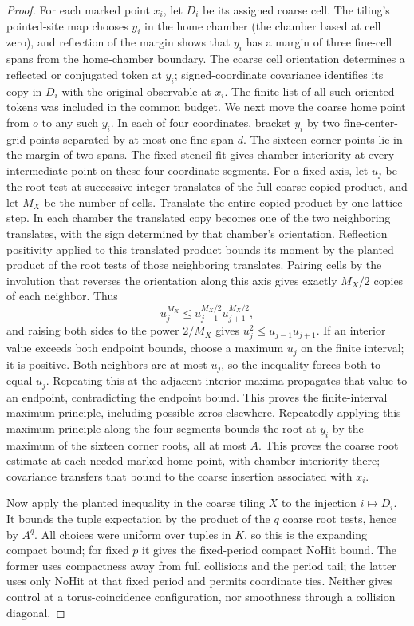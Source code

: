 \begin{proof}
For each marked point $x_i$, let $D_i$ be its assigned coarse cell. The tiling's pointed-site map chooses $y_i$ in the home chamber (the chamber based at cell zero), and reflection of the margin shows that $y_i$ has a margin of three fine-cell spans from the home-chamber boundary. The coarse cell orientation determines a reflected or conjugated token at $y_i$; signed-coordinate covariance identifies its copy in $D_i$ with the original observable at $x_i$. The finite list of all such oriented tokens was included in the common budget. We next move the coarse home point from $o$ to any such $y_i$. In each of four coordinates, bracket $y_i$ by two fine-center-grid points separated by at most one fine span $d$. The sixteen corner points lie in the margin of two spans. The fixed-stencil fit gives chamber interiority at every intermediate point on these four coordinate segments. For a fixed axis, let $u_j$ be the root test at successive integer translates of the full coarse copied product, and let $M_X$ be the number of cells. Translate the entire copied product by one lattice step. In each chamber the translated copy becomes one of the two neighboring translates, with the sign determined by that chamber's orientation. Reflection positivity applied to this translated product bounds its moment by the planted product of the root tests of those neighboring translates. Pairing cells by the involution that reverses the orientation along this axis gives exactly $M_X/2$ copies of each neighbor. Thus
\[
 u_j^{M_X}\leq u_{j-1}^{M_X/2}u_{j+1}^{M_X/2},
\]
and raising both sides to the power $2/M_X$ gives $u_j^2\leq u_{j-1}u_{j+1}$. If an interior value exceeds both endpoint bounds, choose a maximum $u_j$ on the finite interval; it is positive. Both neighbors are at most $u_j$, so the inequality forces both to equal $u_j$. Repeating this at the adjacent interior maxima propagates that value to an endpoint, contradicting the endpoint bound. This proves the finite-interval maximum principle, including possible zeros elsewhere. Repeatedly applying this maximum principle along the four segments bounds the root at $y_i$ by the maximum of the sixteen corner roots, all at most $A$. This proves the coarse root estimate at each needed marked home point, with chamber interiority there; covariance transfers that bound to the coarse insertion associated with $x_i$.

Now apply the planted inequality in the coarse tiling $X$ to the injection $i\mapsto D_i$. It bounds the tuple expectation by the product of the $q$ coarse root tests, hence by $A^q$. All choices were uniform over tuples in $K$, so this is the expanding compact bound; for fixed $p$ it gives the fixed-period compact NoHit bound. The former uses compactness away from full collisions and the period tail; the latter uses only NoHit at that fixed period and permits coordinate ties. Neither gives control at a torus-coincidence configuration, nor smoothness through a collision diagonal.
\end{proof}

